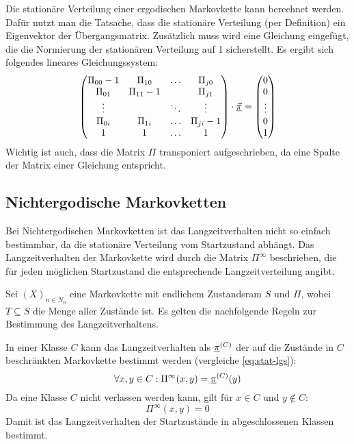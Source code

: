 Die stationäre Verteilung einer ergodischen Markovkette kann berechnet
werden. Dafür nutzt man die Tatsache, dass die stationäre Verteilung (per
Definition) ein Eigenvektor der Übergangsmatrix. Zusätzlich
muss wird eine Gleichung eingefügt, die die Normierung der stationären
Verteilung auf 1 sicherstellt. Es ergibt sich folgendes
lineares Gleichungssystem:
\begin{equation}\label{eq:stat-lgs}
\begin{pmatrix}
\Pi_{00}-1 & \Pi_{10} & \ldots & \Pi_{j0} \\
\Pi_{01} & \Pi_{11}-1 &        & \Pi_{j1} \\
\vdots   &            & \ddots & \vdots \\
\Pi_{0i} & \Pi_{1i} & \ldots &   \Pi_{ji}-1 \\
    1    &     1    & \ldots &   1
\end{pmatrix}\cdot \vec{\underline{\pi}} = \begin{pmatrix}0\\0\\\vdots\\0\\1\end{pmatrix}
\end{equation}
Wichtig ist auch, dass die Matrix $\Pi$ transponiert aufgeschrieben, da eine
Spalte der Matrix einer Gleichung entspricht.

\subsection{Nichtergodische Markovketten}

\newcommand{\lzv}{\Pi^\infty} %

Bei Nichtergodischen Markovketten ist das Langzeitverhalten nicht so einfach
bestimmbar, da die stationäre Verteilung vom Startzustand abhängt. Das
Langzeitverhalten der Markovkette wird durch die Matrix $\lzv$ beschrieben,
die für jeden möglichen Startzustand die entsprechende Langzeitverteilung
angibt.

\medskip
Sei $(X)_{n\in N_0}$ eine Markovkette mit endlichem Zustandsram $S$ und
 $\Pi$, wobei $T\subseteq S$ die Menge aller
 Zustände ist. Es gelten die nachfolgende Regeln
zur Bestimmung des Langzeitverhaltens.

In einer  Klasse $C$ kann das
Langzeitverhalten als 
$\underline{\pi}^{(C)}$ der auf die Zustände in $C$ beschränkten Markovkette bestimmt
werden (vergleiche \eqref{eq:stat-lgs}):
\begin{equation}\label{eq:lzv-abg-abg}
  \forall x,y\in C: \lzv(x,y) = \stat^{(C)}(y)
\end{equation}
Da eine  Klasse $C$ nicht
verlassen werden kann, gilt für $x\in C$ und $y \notin C$:
\begin{equation}\label{eq:lzv-abg-x}
  \lzv(x,y) = 0
\end{equation}
Damit ist das Langzeitverhalten der Startzustände in abgeschlossenen Klassen
bestimmt.

